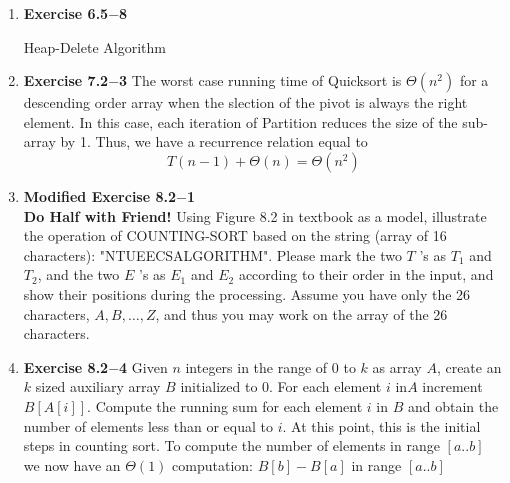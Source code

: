 \documentclass[a4paper,11pt,oneside]{book}
\begin{document}
\noindent{}
\normalsize

\begin{enumerate}
  \item {\textbf{Exercise 6.5$-$8}} 
  \begin{algorithm}
    \caption{Heap-Delete Algorithm}
    \begin{algorithmic}[1]
        \EndFunction
    \end{algorithmic}
\end{algorithm}

  \item {\textbf{Exercise 7.2$-$3}}
  The worst case running time of Quicksort is $\Theta\left(n^2\right)$ for a descending order array when the slection of the pivot is always the right element. 
  In this case, each iteration of Partition reduces the size of the sub-array by 1. Thus, we have a recurrence relation equal to 
  \[T(n-1)+\Theta(n) = \Theta(n^2)\]

  \item {\textbf{Modified Exercise 8.2$-$1}}
  \\ \textbf{Do Half with Friend!}
  Using Figure 8.2 in textbook as a model, illustrate the operation of COUNTING-SORT based on the string (array of 16 characters): "NTUEECSALGORITHM". Please mark the two $T$ 's as $T_1$ and $T_2$, and the two $E$ 's as $E_1$ and $E_2$ according to their order in the input, and show their positions during the processing. Assume you have only the 26 characters, $A, B, \ldots, Z$, and thus you may work on the array of the 26 characters.
  
  \item {\textbf{Exercise 8.2$-$4}} Given $n$ integers in the range of 0 to $k$ as array $A$, create an $k$ sized auxiliary array $B$ initialized to $0$.
  For each element $i \text{ in} A$ increment $B[A[i]]$. Compute the running sum for each element $i$ in $B$ 
  and obtain the number of elements less than or equal to $i$. At this point, this is the initial steps in counting sort.
  To compute the number of elements in range $[a..b]$ we now have an $\Theta(1)$ computation: $B[b] - B[a]$
  in range $[a..b]$   
  

\end{enumerate}
\end{document}
